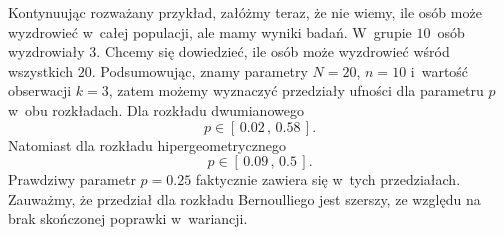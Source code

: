 Kontynuując rozważany przykład, załóżmy teraz, że nie wiemy, ile osób może wyzdrowieć w~całej populacji, ale mamy wyniki badań. W~grupie $10$~osób wyzdrowiały $3$. Chcemy się dowiedzieć, ile osób może wyzdrowieć wśród wszystkich $20$. Podsumowując, znamy parametry $N=20$, $n=10$ i~wartość obserwacji $k=3$, zatem możemy wyznaczyć przedziały ufności dla parametru $p$ w~obu rozkładach. Dla rozkładu dwumianowego
\begin{equation}
p\in \left[\, 0.02 \, , \, 0.58\, \right].
\end{equation}
Natomiast dla rozkładu hipergeometrycznego
\begin{equation}
p\in \left[\, 0.09 \, , \, 0.5\, \right].
\end{equation}
Prawdziwy parametr $p=0.25$ faktycznie zawiera się w~tych przedziałach. Zauważmy, że przedział dla rozkładu Bernoulliego jest szerszy, ze względu na brak skończonej poprawki w~wariancji.




